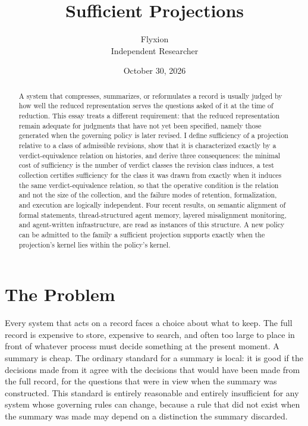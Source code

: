 \documentclass[11pt]{article}
\title{Sufficient Projections}
\author{Flyxion\\Independent Researcher}
\date{October 30, 2026}
\theoremstyle{remark}
\begin{document}
\maketitle

\begin{abstract}
A system that compresses, summarizes, or reformulates a record is usually judged by how well the reduced representation serves the questions asked of it at the time of reduction. This essay treats a different requirement: that the reduced representation remain adequate for judgments that have not yet been specified, namely those generated when the governing policy is later revised. I define sufficiency of a projection relative to a class of admissible revisions, show that it is characterized exactly by a verdict-equivalence relation on histories, and derive three consequences: the minimal cost of sufficiency is the number of verdict classes the revision class induces, a test collection certifies sufficiency for the class it was drawn from exactly when it induces the same verdict-equivalence relation, so that the operative condition is the relation and not the size of the collection, and the failure modes of retention, formalization, and execution are logically independent. Four recent results, on semantic alignment of formal statements, thread-structured agent memory, layered misalignment monitoring, and agent-written infrastructure, are read as instances of this structure. A new policy can be admitted to the family a sufficient projection supports exactly when the projection's kernel lies within the policy's kernel.
\end{abstract}

\section{The Problem}

Every system that acts on a record faces a choice about what to keep. The full record is expensive to store, expensive to search, and often too large to place in front of whatever process must decide something at the present moment. A summary is cheap. The ordinary standard for a summary is local: it is good if the decisions made from it agree with the decisions that would have been made from the full record, for the questions that were in view when the summary was constructed. This standard is entirely reasonable and entirely insufficient for any system whose governing rules can change, because a rule that did not exist when the summary was made may depend on a distinction the summary discarded.
\end{document}
